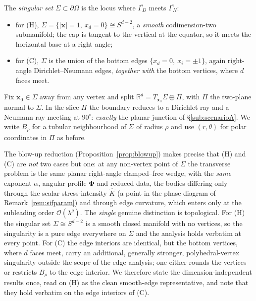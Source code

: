 The \emph{singular set} $\Sigma\subset\partial\Omega$ is the locus where $\overline{\Gamma_D}$ meets
$\overline{\Gamma_N}$:
\begin{itemize}
    \item for (H), $\Sigma=\{|\bm{x}|=1,\ x_d=0\}\cong S^{d-2}$, a \emph{smooth} codimension-two submanifold; the cap is tangent
          to the vertical at the equator, so it meets the horizontal base at a right angle;
    \item for (C), $\Sigma$ is the union of the bottom edges $\{x_d=0,\ x_i=\pm1\}$, again right-angle Dirichlet--Neumann edges,
          \emph{together with} the bottom vertices, where $d$ faces meet.
\end{itemize}

Fix $\bm{x}_0\in\Sigma$ away from any vertex and split $\mathbb{R}^d=T_{\bm{x}_0}\Sigma\oplus\Pi$, with $\Pi$ the
two-plane normal to $\Sigma$. In the slice $\Pi$ the boundary reduces to a Dirichlet ray and a Neumann ray meeting at
$90^\circ$: \emph{exactly} the planar junction of \S\ref{sub:scenarioA}. We write $B_\rho$ for a tubular neighbourhood
of $\Sigma$ of radius $\rho$ and use $(r,\theta)$ for polar coordinates in $\Pi$ as before.

\begin{remark}
    \label{rem:cleanmodel}
    The blow-up reduction (Proposition~\ref{prop:blowup}) makes precise that (H) and (C) are \emph{not} two cases but
    one: at any non-vertex point of $\Sigma$ the transverse problem is the same planar right-angle clamped--free wedge,
    with the \emph{same} exponent $\alpha$, angular profile $\bm{\Phi}$ and reduced data, the bodies differing only
    through the scalar stress-intensity $\hat K$ (a point in the phase diagram of Remark~\ref{rem:sifparam}) and through
    edge curvature, which enters only at the subleading order $\mathcal{O}(\lambda^{g})$. The \emph{single} genuine
    distinction is topological. For (H) the singular set $\Sigma\cong S^{d-2}$ is a smooth closed manifold with no
    vertices, so the singularity is a pure edge everywhere on $\Sigma$ and the analysis holds verbatim at every point.
    For (C) the edge interiors are identical, but the bottom vertices, where $d$ faces meet, carry an additional,
    generally stronger, polyhedral-vertex singularity \cite{MazyaRossmann2010} outside the scope of the edge analysis;
    one either rounds the vertices or restricts $B_\rho$ to the edge interior. We therefore state the
    dimension-independent results once, read on (H) as the clean smooth-edge representative, and note that they hold
    verbatim on the edge interiors of (C).
\end{remark}

